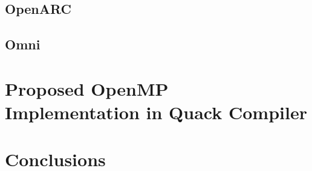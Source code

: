 \documentclass[11pt,journal]{IEEEtran}
\begin{document}
\subsection{OpenARC}

\subsection{Omni}

\section{Proposed OpenMP Implementation in Quack Compiler}

\section{Conclusions}

\ifCLASSOPTIONcaptionsoff
  \newpage
\fi

\nocite{*}


\end{document}
